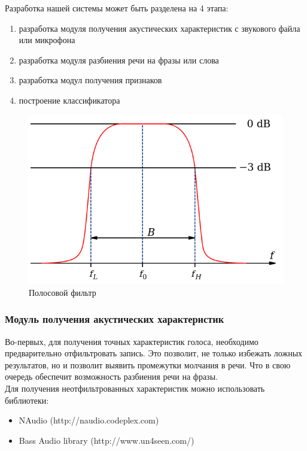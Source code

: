 \documentclass[14pt]{extarticle}
\begin{document}
Разработка нашей системы может быть разделена на 4 этапа:
\begin{enumerate}
	\item разработка модуля получения акустических характеристик с звукового файла или микрофона
	\item разработка модуля разбиения речи на фразы или слова
	\item разработка модул получения признаков
	\item построение классификатора
\end{enumerate}

\begin{figure}
	\centering
		\includegraphics[scale=0.7]{images/pass-band-filter.png}
	\caption{Полосовой фильтр}
	\label{fig:pass-band-filter}
\end{figure}

\subsubsection{Модуль получения акустических характеристик}

Во-первых, для получения точных характеристик голоса, необходимо предварительно отфильтровать запись. Это позволит, не только избежать ложных результатов, но и позволит выявить промежутки молчания в речи. Что в свою очередь обеспечит возможность разбиения речи на фразы.
\\

Для получения неотфильтрованных характеристик можно использовать библиотеки:
\begin{itemize}
	\item NAudio (http://naudio.codeplex.com)
	\item Bass Audio library (http://www.un4seen.com/)
\end{itemize}
\end{document}
